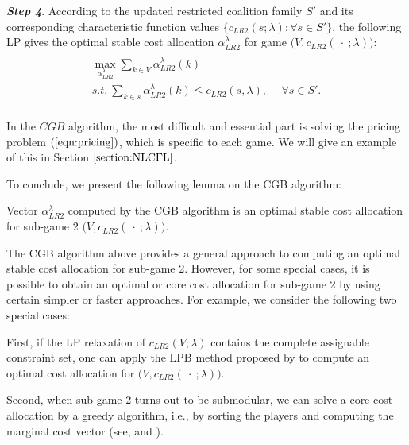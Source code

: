 \documentclass[ijoc,nonblindrev]{informs3} %
\begin{document}
\textbf{\em Step 4}. According to the updated restricted coalition family $S'$ and its corresponding characteristic function values $\{c_{LR2}(s;\lambda):\forall s \in S' \}$, the following LP gives the optimal stable cost allocation $\alpha_{LR2}^{\lambda}$ for game $\big(V, c_{LR2}(\ \cdot\ ;\lambda)\big)$:
\begin{eqnarray*}\label{eqn:alpha2}
\begin{aligned}
\begin{split}
\max_{\alpha_{LR2}^{\lambda}} \sum_{k \in  V} \alpha_{LR2}^{\lambda}(k)~~&\\
s.t.~\sum_{k \in s} \alpha_{LR2}^{\lambda}(k) \leq  c_{LR2}(s,\lambda),&~~\forall s \in S'.
\end{split}
\end{aligned}
\end{eqnarray*}

In the $CGB$ algorithm, the most difficult and essential part is solving the pricing problem $(\ref{eqn:pricing})$, which is specific to each game. We will give an example of this in Section $\ref{section:NLCFL}$.

To conclude, we present the following lemma on the CGB algorithm:
\begin {lemma}\label{lemma:lr2core}
Vector $\alpha_{LR2}^{\lambda}$ computed by the CGB algorithm is an optimal stable cost allocation for sub-game 2 $\big(V,c_{LR2}(\ \cdot\ ;\lambda)\big)$.
\end {lemma}



The CGB algorithm above provides a general approach to computing an optimal stable cost allocation for sub-game 2. 
However, for some special cases, it is possible to obtain an optimal or core cost allocation for sub-game 2 by using certain simpler or faster approaches. For example, we consider the following two special cases:


First, if the LP relaxation of $c_{LR2}(V;\lambda)$ contains the complete assignable constraint set, one can apply the LPB method proposed by \cite{Caprara2010LPB} to compute an optimal cost allocation for $\big(V,c_{LR2}(\ \cdot\ ;\lambda)\big)$.

Second, when sub-game 2 turns out to be submodular, we can solve a core cost allocation by a greedy algorithm, i.e., by sorting the players and computing the marginal cost vector (see, \citealt{edmonds1970submodular} and \citealt{shapley1971cores}). 
\end{document}
